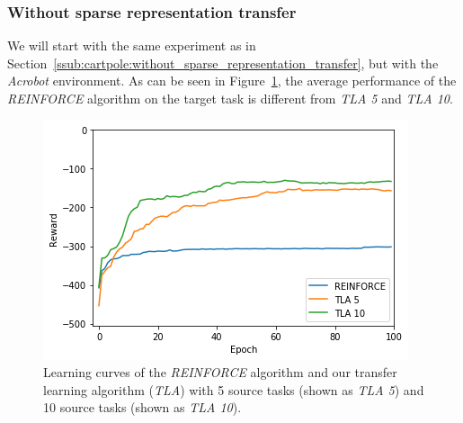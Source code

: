 \subsubsection{Without sparse representation transfer} %
\label{ssub:acrobot:without_sparse_representation_transfer}
We will start with the same experiment as in Section~\ref{ssub:cartpole:without_sparse_representation_transfer}, but with the \textit{Acrobot} environment.
As can be seen in Figure~\ref{fig:Acrobot:reward_target_re-akt5-akt10}, the average performance of  the \textit{REINFORCE} algorithm on the target task is different from \textit{TLA 5} and \textit{TLA 10}.
\begin{figure}[H]
    \centering
    \includegraphics[width=.8\linewidth]{images/results/Acrobot/no_sparse_transfer/reward_target_re-akt5-akt10.png}
    \caption[Learning curves for the \textit{Acrobot} environment of \textit{REINFORCE} and \textit{TLA} for the \emph{Acrobot} environment]{Learning curves of the \textit{REINFORCE} algorithm and our transfer learning algorithm (\textit{TLA}) with 5 source tasks (shown as \textit{TLA 5}) and 10 source tasks (shown as \textit{TLA 10}).}
    \label{fig:Acrobot:reward_target_re-akt5-akt10}
\end{figure}

